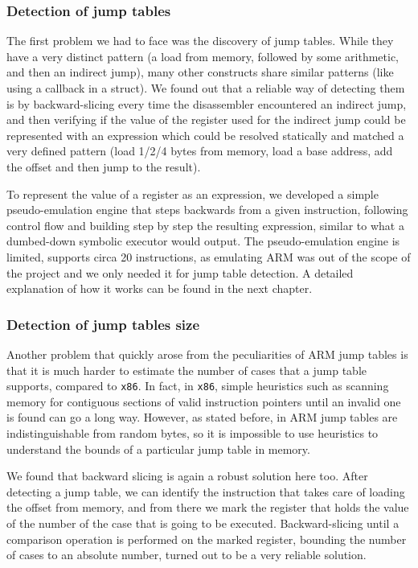 \documentclass[a4paper,11pt,oneside]{report}
\begin{document}
\subsubsection{Detection of jump tables}
The first problem we had to face was the discovery of jump tables. While they 
have a very distinct pattern (a load from memory, followed by some arithmetic, 
and then an indirect jump), many other constructs share similar patterns (like 
using a callback in a struct). We found out that a reliable way of detecting 
them is by backward-slicing every time the disassembler encountered an indirect 
jump, and then verifying if the value of the register used for the indirect 
jump could be represented with an expression which could be resolved statically 
and matched a very defined pattern (load 1/2/4 bytes from memory, load a base 
address, add the offset and then jump to the result). 

To represent the value of a register as an expression, we developed a simple
pseudo-emulation engine that steps backwards from a given instruction, 
following control flow and building step by step the resulting expression, 
similar to what a dumbed-down symbolic executor would output. The 
pseudo-emulation engine is limited, supports circa 20 instructions, as 
emulating ARM was out of the scope of the project and we only needed it for 
jump table detection. A detailed explanation of how it works can be found in 
the next chapter.

\subsubsection{Detection of jump tables size}
Another problem that quickly arose from the peculiarities of ARM jump tables is 
that it is much harder to estimate the number of cases that a jump table 
supports, compared to \texttt{x86}. In fact, in \texttt{x86}, simple heuristics 
such as scanning memory for contiguous sections of valid instruction pointers 
until an invalid one is found can go a long way. However, as stated before, in 
ARM jump tables are indistinguishable from random bytes, so it is impossible to 
use heuristics to understand the bounds of a particular jump table in memory.

We found that backward slicing is again a robust solution here too. After 
detecting a jump table, we can identify the instruction that takes care of 
loading the offset from memory, and from there we mark the register that holds 
the value of the number of the case that is going to be executed.  
Backward-slicing until a comparison operation is performed on the marked 
register, bounding the number of cases to an absolute number, turned out to be 
a very reliable solution.  
\end{document}
